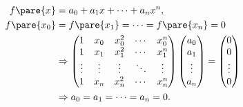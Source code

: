 \documentclass[hidelinks]{ctexart}
\begin{document}
\begin{align*}
    f\pare{x} &= a_0 + a_1 x + \cdots + a_n x^n,\\
    f\pare{x_0} &= f\pare{x_1} = \cdots = f\pare{x_n} = 0 \\
    &\Rightarrow \begin{pmatrix}
        1 & x_0 & x_0^2 & \cdots & x_0^n \\
        1 & x_1 & x_1^2 & \cdots & x_1^n \\
        \vdots & \vdots & \vdots & \ddots & \vdots \\
        1 & x_n & x_n^2 & \cdots & x_n^n
    \end{pmatrix}\begin{pmatrix}
        a_0 \\ a_1 \\ \vdots \\ a_n
    \end{pmatrix} = \begin{pmatrix}
        0 \\ 0 \\ \vdots \\ 0
    \end{pmatrix} \\
    &\Rightarrow a_0 = a_1 = \cdots = a_n = 0.
\end{align*}
\end{document}
